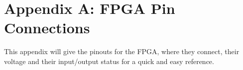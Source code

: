\section{Appendix A: FPGA Pin Connections} %
    This appendix will give the pinouts for the FPGA, where they connect, their voltage and their
    input/output status for a quick and easy reference.
